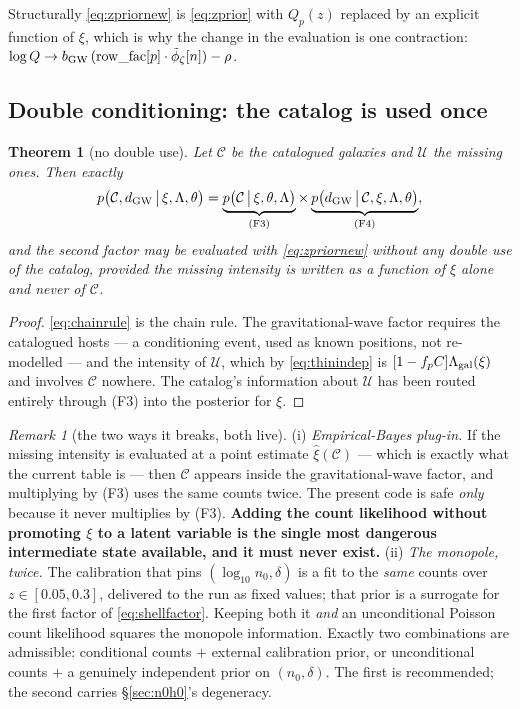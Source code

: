 \documentclass[11pt]{article}
\newtheorem{theorem}{Theorem}
\theoremstyle{definition}
\theoremstyle{remark}
\newtheorem{remark}{Remark}
\newcommand{\bgw}{b_{\rm GW}}
\newcommand{\dgw}{d_{\rm GW}}
\newcommand{\Lgal}{\Lambda_{\rm gal}}
\begin{document}
Structurally \eqref{eq:zpriornew} is \eqref{eq:zprior} with $Q_p(z)$ replaced by an
explicit function of $\xi$, which is why the change in the evaluation is one
contraction: $\log Q\to\bgw\,(\mathrm{row\_fac}[p]\cdot\tilde\phi_\zeta[n])-\rho$.

\subsection{Double conditioning: the catalog is used once}
\label{sec:double}

\begin{theorem}[no double use]
\label{thm:double}
Let $\mathcal C$ be the catalogued galaxies and $\mathcal U$ the missing ones. Then
exactly
\begin{equation}
  p\big(\mathcal C,\dgw\,\big|\,\xi,\Lambda,\theta\big)
  =\underbrace{p\big(\mathcal C\,\big|\,\xi,\theta,\Lambda\big)}_{\rm (F3)}
  \times\underbrace{p\big(\dgw\,\big|\,\mathcal C,\xi,\Lambda,\theta\big)}_{\rm (F4)},
  \label{eq:chainrule}
\end{equation}
and the second factor may be evaluated with \eqref{eq:zpriornew} without any double
use of the catalog, \emph{provided the missing intensity is written as a function of
$\xi$ alone and never of $\mathcal C$.}
\end{theorem}
\begin{proof}
\eqref{eq:chainrule} is the chain rule. The gravitational-wave factor requires the
catalogued hosts --- a conditioning event, used as known positions, not re-modelled
--- and the intensity of $\mathcal U$, which by \eqref{eq:thinindep} is
$[1-f_pC]\Lgal(\xi)$ and involves $\mathcal C$ nowhere. The catalog's information
about $\mathcal U$ has been routed entirely through (F3) into the posterior for
$\xi$.
\end{proof}

\begin{remark}[the two ways it breaks, both live]
\label{rem:doublebreak}
(i) \emph{Empirical-Bayes plug-in.} If the missing intensity is evaluated at a
point estimate $\hat\xi(\mathcal C)$ --- which is exactly what the current table is
--- then $\mathcal C$ appears inside the gravitational-wave factor, and multiplying
by (F3) uses the same counts twice. The present code is safe \emph{only} because it
never multiplies by (F3). \textbf{Adding the count likelihood without promoting
$\xi$ to a latent variable is the single most dangerous intermediate state
available, and it must never exist.}
(ii) \emph{The monopole, twice.} The calibration that pins $(\log_{10}n_0,\delta)$
is a fit to the \emph{same} counts over $z\in[0.05,0.3]$, delivered to the run as
fixed values; that prior is a surrogate for the first factor of
\eqref{eq:shellfactor}. Keeping both it \emph{and} an unconditional Poisson count
likelihood squares the monopole information. Exactly two combinations are
admissible: conditional counts $+$ external calibration prior, or unconditional
counts $+$ a genuinely independent prior on $(n_0,\delta)$. The first is
recommended; the second carries \S\ref{sec:n0h0}'s degeneracy.
\end{remark}
\end{document}
